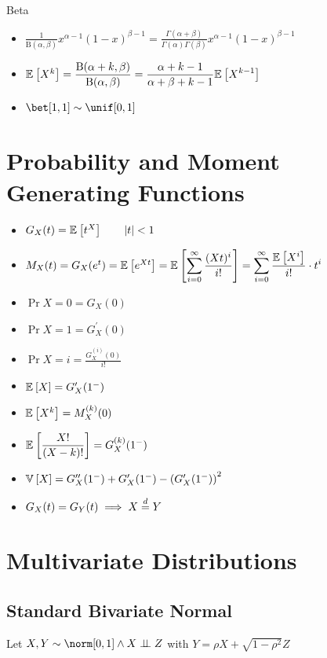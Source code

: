 \documentclass[landscape]{article}
\begin{document}
\begin{multicols*}{2}
Beta
\begin{itemize}
  \item $\displaystyle
    \frac{1}{\text{B}(\alpha,\beta)}x^{\alpha-1}(1-x)^{\beta-1} 
    = \frac{\Gamma(\alpha+\beta)}{\Gamma(\alpha)\Gamma(\beta)}
    x^{\alpha-1}(1-x)^{\beta-1} $
  \item $\mathbb{E}_{}\left[X^k\right] 
    = \displaystyle\frac{\text{B}(\alpha+k,\beta)}{\text{B}(\alpha,\beta)}
    = \displaystyle\frac{\alpha+k-1}{\alpha+\beta+k-1}\mathbb{E}_{}\left[X^{k-1}\right]$
  \item $\bet[1,1] \dist \unif[0,1]$
\end{itemize}

\section{Probability and Moment Generating Functions}

\begin{itemize}
  \item $G_X(t) = \mathbb{E}_{}\left[t^X\right] \qquad |t| < 1$
  \item $M_X(t) = G_X(e^t) = \mathbb{E}_{}\left[e^{Xt}\right] 
    = \mathbb{E}_{}\left[ \displaystyle\sum_{i=0}^\infty \frac{(Xt)^i}{i!}\right]
    = \displaystyle\sum_{i=0}^\infty \frac{\mathbb{E}_{}\left[X^i\right]}{i!}\cdot t^i$
  \item $\Pr{X=0} = G_X(0)$
  \item $\Pr{X=1}=G_X^\prime(0)$
  \item $\Pr{X=i} = \displaystyle\frac{G_X^{(i)}(0)}{i!}$
  \item $\mathbb{E}_{}\left[X\right] = G_X^\prime(1^-)$
  \item $\mathbb{E}_{}\left[X^k\right] = M_X^{(k)}(0)$
  \item $\mathbb{E}_{}\left[\displaystyle\frac{X!}{(X-k)!}\right] = G_X^{(k)}(1^-)$
  \item $\mathbb{V}_{}\left[X\right] = G_X^{\prime\prime}(1^-) + G_X^\prime(1^-) 
    - \left(G_X^\prime(1^-)\right)^2$
  \item $G_X(t) = G_Y(t) \;\Longrightarrow\; X \stackrel{d}{=} Y$
\end{itemize}

\section{Multivariate Distributions}

\subsection{Standard Bivariate Normal}

Let $X,Y\dist\norm[0,1] \wedge X\ind Z$ with 
$Y = \rho X + \sqrt{1-\rho^2}Z$\\


\end{multicols*}
\end{document}
